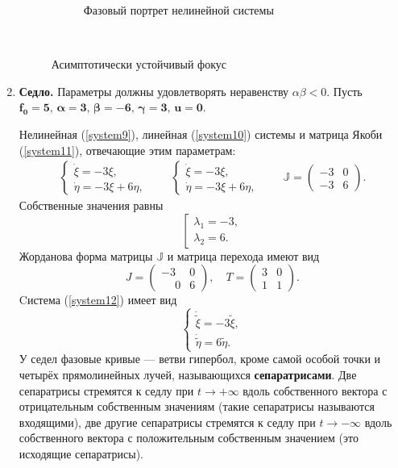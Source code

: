 \documentclass[12pt, a4paper]{article}
\begin{document}
\begin{enumerate}
\begin{figure}[H]
\begin{subfigure}[H]{0.4\textwidth}
		\caption{Фазовый портрет нелинейной системы}
	\end{subfigure}	
	\\[0.2cm]
	\caption{Асимптотически устойчивый фокус}
\end{figure}	
\item \textbf{Седло.} Параметры должны удовлетворять неравенству $\alpha\beta<0$. Пусть $\boldsymbol{f_0=5,\,\alpha=3,\,\beta=-6,\,\gamma=3,\,u=0}$.

Нелинейная (\ref{system9}), линейная (\ref{system10}) системы и матрица Якоби (\ref{system11}), отвечающие этим параметрам:
\begin{gather*}
	\begin{cases}
		\dot \xi=-3\xi,\\
		\dot \eta=-3\xi+6\eta,
	\end{cases}
	\qquad
	\begin{cases}
		\dot\xi=-3\xi,\\
		\dot \eta=-3\xi+6\eta,
	\end{cases}
	\qquad
	\mathbb{J}=\begin{pmatrix}
		-3 & 0 \\
		-3 & 6
	\end{pmatrix}.
\end{gather*}
Собственные значения равны
\[
\left[
\begin{array}{l}
	\lambda_1=-3, \\
	\lambda_2=6.
\end{array}
\right.
\]
Жорданова форма матрицы $\mathbb{J}$ и матрица перехода имеют вид
\[
J=\begin{pmatrix}
	-3 & 0 \\
	\phantom{-}0 & 6
\end{pmatrix},
\quad
T=\begin{pmatrix}
	3 & 0 \\
	1 & 1
\end{pmatrix}.
\]
Cистема (\ref{system12}) имеет вид
\[
\begin{cases}
	\dot{\tilde{\xi}}=-3\tilde{\xi},\\
	\dot{\tilde{\eta}}=6\tilde{\eta}.
\end{cases}
\]
У седел фазовые кривые — ветви гипербол, кроме самой особой точки и четырёх прямолинейных лучей, называющихся \textbf{сепаратрисами}. Две сепаратрисы стремятся к седлу при $t\to+\infty$ вдоль собственного вектора с отрицательным собственным значениям (такие сепаратрисы называются входящими), две другие сепаратрисы стремятся к седлу при $t\to-\infty$ 
вдоль собственного вектора с положительным собственным значением (это исходящие сепаратрисы).

\end{enumerate}
\end{document}
